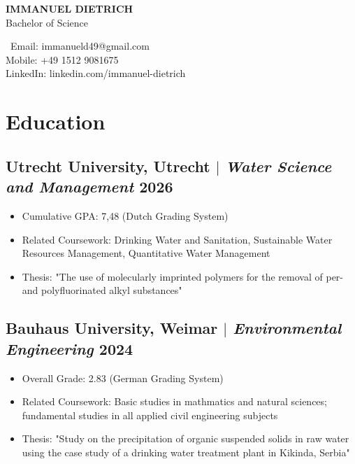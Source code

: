 \documentclass[11pt]{article} %
\begin{document}
\begin{center}
	\begin{minipage}{0.49\textwidth}
		{\LARGE\bfseries
			IMMANUEL DIETRICH %
		} \\ \medskip
		Bachelor of Science %
	\end{minipage} \hfill
	\begin{minipage}{0.5\textwidth}
		\raggedleft\
		Email: immanueld49@gmail.com \\
		Mobile: +49 1512 9081675 \\
		{\small LinkedIn: linkedin.com/immanuel-dietrich} \\
	\end{minipage}
\end{center}

\section{Education}
\subsection{Utrecht University, Utrecht $|$ {\normalfont\itshape Water Science and Management} \hfill 2026}
\begin{itemize}
	\item Cumulative GPA: 7,48 (Dutch Grading System)
  \item Related Coursework: Drinking Water and Sanitation, Sustainable Water Resources Management, Quantitative Water Management
  \item Thesis: "The use of molecularly imprinted polymers for the removal of per-and polyfluorinated alkyl substances"
\end{itemize}

\subsection{Bauhaus University, Weimar $|$ {\normalfont\itshape Environmental Engineering} \hfill 2024}
\begin{itemize}
	\item Overall Grade: 2.83 (German Grading System)
  \item Related Coursework: Basic studies in mathmatics and natural sciences; fundamental studies in all applied civil engineering subjects
  \item Thesis: "Study on the precipitation of organic suspended solids in raw water using the case study of a drinking water treatment plant in Kikinda, Serbia" 
\end{itemize}
\end{document}
